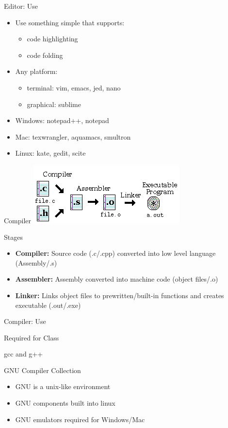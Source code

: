 \documentclass[xcolor={dvipsnames}]{beamer}
\begin{document}
\begin{frame}{Editor: Use}
	\begin{itemize}
	\item Use something simple that supports:
		\begin{itemize}
			\item code highlighting
			\item code folding
		\end{itemize}
	\pause
		\item Any platform:
		\begin{itemize} 
			\item terminal: vim, emacs, jed, nano
			\item graphical: sublime
		\end{itemize}
	\pause
		\item Windows: notepad++, notepad
		\item Mac: texwrangler, aquamacs, smultron
		\item Linux: kate, gedit, scite
	\end{itemize}
\end{frame}

\begin{frame}{Compiler}
		\href{http://krnlpanic.com/wp/c-compiler-basics/}{\includegraphics{compile1}}
		\pause
		\begin{block}{Stages}
		\begin{itemize}
			\item \textbf{Compiler:} Source code (.c/.cpp) converted into low level language (Assembly/.s)
			\pause
			\item \textbf{Assembler:} Assembly converted into machine code (object files/.o)
			\pause
			\item \textbf{Linker:} Links object files to prewritten/built-in functions and creates executable (.out/.exe)
		\end{itemize}
		\end{block}
\end{frame}

\begin{frame}{Compiler: Use}
	\begin{block}{Required for Class}
		\begin{center}
			gcc and  g++
		\end{center}
	\end{block}
	\pause
	\begin{block}{GNU Compiler Collection}
		\begin{itemize}
			\item GNU is a unix-like environment
			\item GNU components built into linux
			\item GNU emulators required for Windows/Mac
		\end{itemize}
	\end{block}
\end{frame}
\end{document}
